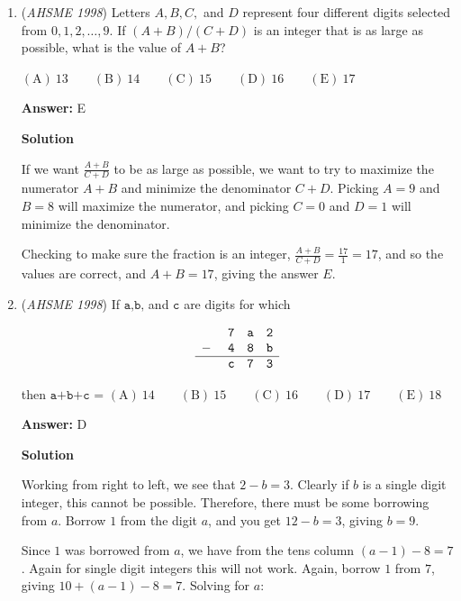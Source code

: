 \begin{enumerate}
	\item (\textit{AHSME 1998}) Letters $A,B,C,$ and $D$ represent four different digits selected from $0,1,2,\ldots ,9.$ If $(A+B)/(C+D)$ is an integer that is as large as possible, what is the value of $A+B$?


 $\mathrm{(A) \  }13 \qquad \mathrm{(B) \  }14 \qquad \mathrm{(C) \  } 15\qquad \mathrm{(D) \  }16 \qquad \mathrm{(E) \  } 17$

 \textbf{Answer: }E



\textbf{Solution}

If we want $\frac{A+B}{C+D}$ to be as large as possible, we want to try to maximize the numerator $A+B$ and minimize the denominator $C+D$.  Picking $A=9$ and $B=8$ will maximize the numerator, and picking $C=0$ and $D=1$ will minimize the denominator.  

 Checking to make sure the fraction is an integer, $\frac{A+B}{C+D} = \frac{17}{1} = 17$, and so the values are correct, and $A+B = 17$, giving the answer $\boxed{E}$.

 


	\item (\textit{AHSME 1998}) If $\texttt{a,b,}$ and $\texttt{c}$ are digits for which


 
 \[\begin{array}{rccc}&\ \texttt{7}& \texttt{a}&\texttt{2}\\ -&\ \texttt{4}&\texttt{8}&\texttt{b} \\  \hline  &\ \texttt{c}&\texttt{7}& \texttt{3} \end{array}\]


 then $\texttt{a+b+c =}$
$\mathrm{(A) \  }14 \qquad \mathrm{(B) \  }15 \qquad \mathrm{(C) \  }16 \qquad \mathrm{(D) \  }17 \qquad \mathrm{(E) \  }18$

 \textbf{Answer: }D



\textbf{Solution}

Working from right to left, we see that $2 - b = 3$.  Clearly if $b$ is a single digit integer, this cannot be possible.  Therefore, there must be some borrowing from $a$.  Borrow $1$ from the digit $a$, and you get $12 - b = 3$, giving $b = 9$.

 Since $1$ was borrowed from $a$, we have from the tens column $(a-1) - 8 = 7$.  Again for single digit integers this will not work.  Again, borrow $1$ from $7$, giving $10 + (a-1) - 8 = 7$.  Solving for $a$:


\end{enumerate}
